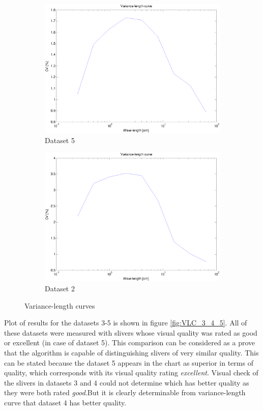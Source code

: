 \documentclass[twoside]{ctuthesis}
\theoremstyle{plain}
\theoremstyle{definition}
\theoremstyle{note}
\begin{document}
\begin{figure}
	\centering
	\begin{subfigure}{0.5\textwidth}
		\centering
		\includegraphics[width=1.0\linewidth]{full_VLC_11.eps}
		\caption{Dataset 5}
		\label{fig:sub_dataset5}
	\end{subfigure}%
	\begin{subfigure}{0.5\textwidth}
		\centering
		\includegraphics[width=1.0\linewidth]{full_VLC_6.eps}
		\caption{Dataset 2}
		\label{fig:sub_dataset2}
	\end{subfigure}
	\caption{Variance-length curves}
	\label{fig:vlc_curves}
\end{figure}

Plot of results for the datasets 3-5 is shown in figure \ref{fig:VLC_3_4_5}. All of these datasets were measured with slivers whose visual quality was rated as good or excellent (in case of dataset 5). This comparison can be considered as a prove that the algorithm is capable of distinguishing slivers of very similar quality. This can be stated because the dataset 5 appears in the chart as superior in terms of quality, which corresponds with its visual quality rating \textit{excellent}. Visual check of the slivers in datasets 3 and 4 could not determine which has better quality as they were both rated \textit{good}.But it is clearly determinable from variance-length curve that dataset 4 has better quality.
\end{document}
